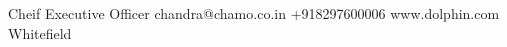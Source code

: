\documentclass{../src-tex/amm-pst-business-card}
\begin{document}
%
\thispagestyle{empty}%
%
{Cheif Executive Officer}%
{chandra@chamo.co.in}%
{+918297600006}%
{www.dolphin.com}%
{Whitefield}%
{ }%
\end{document}
